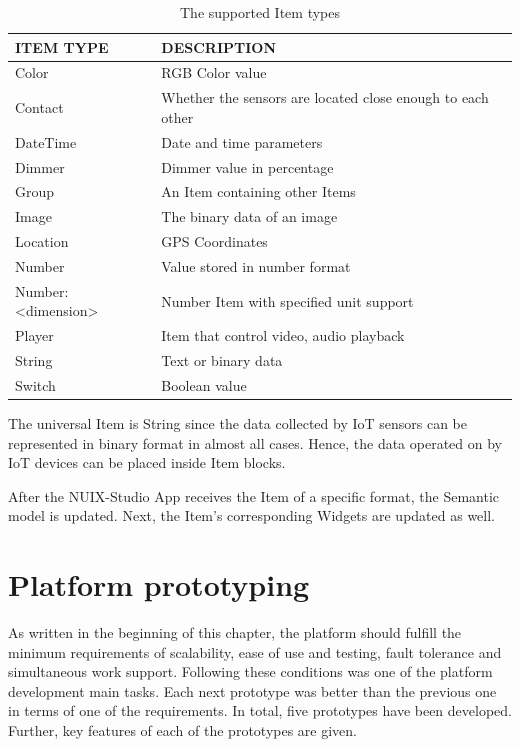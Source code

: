 \begin{table}
  \centering
  \begin{threeparttable}[c]
    \caption{The supported Item types}
    \label{tab:items-table}
    \begin{tabular}{ll}
      \toprule
      ITEM TYPE    &         DESCRIPTION                 \\
      \midrule
      Color &	RGB Color value \\
      Contact & Whether the sensors are located close enough to each other \\
      DateTime & Date and time parameters \\
      Dimmer &	Dimmer value in percentage \\
      Group &	An Item containing other Items \\
      Image &	The binary data of an image \\
      Location & GPS Coordinates \\
      Number & Value stored in number format \\
      Number:<dimension> & Number Item with specified unit support \\
      Player & Item that control video, audio playback \\
      String &	Text or binary data \\
      Switch & Boolean value \\
      \bottomrule
    \end{tabular}
  \end{threeparttable}
\end{table}

The universal Item is String since the data collected by IoT sensors can be represented in binary format in almost all cases. Hence, the data operated on by IoT devices can be placed inside Item blocks.

After the NUIX-Studio App receives the Item of a specific format, the Semantic model is updated. Next, the Item's corresponding Widgets are updated as well.


\section{Platform prototyping}

As written in the beginning of this chapter, the platform should fulfill the minimum requirements of scalability, ease of use and testing, fault tolerance and simultaneous work support. Following these conditions was one of the platform development main tasks. Each next prototype was better than the previous one in terms of one of the requirements. In total, five prototypes have been developed. Further, key features of each of the prototypes are given.

